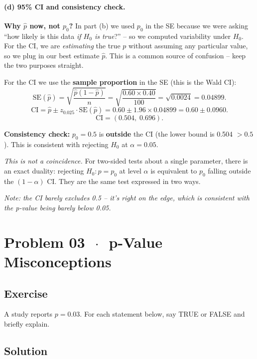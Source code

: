 \documentclass[11pt]{article}
\newcommand{\phat}{\hat{p}}
\begin{document}
\paragraph{(d) 95\% CI and consistency check.}

\textbf{Why $\phat$ now, not $p_0$?} In part (b) we used $p_0$ in the SE because we were asking ``how likely is this data \textit{if $H_0$ is true}?'' -- so we computed variability under $H_0$. For the CI, we are \textit{estimating} the true $p$ without assuming any particular value, so we plug in our best estimate $\phat$. This is a common source of confusion -- keep the two purposes straight.

For the CI we use the \textbf{sample proportion} in the SE (this is the Wald CI):
\[
  \text{SE}(\phat) = \sqrt{\frac{\phat(1-\phat)}{n}} = \sqrt{\frac{0.60 \times 0.40}{100}} = \sqrt{0.0024} = 0.04899.
\]
\[
  \text{CI} = \phat \pm z_{0.025} \cdot \text{SE}(\phat) = 0.60 \pm 1.96 \times 0.04899 = 0.60 \pm 0.0960.
\]
\[
  \boxed{\text{CI} = (0.504,\; 0.696)}.
\]

\textbf{Consistency check:} $p_0 = 0.5$ is \textbf{outside} the CI (the lower bound is 0.504 $> 0.5$). This is consistent with rejecting $H_0$ at $\alpha = 0.05$.

\textit{This is not a coincidence.} For two-sided tests about a single parameter, there is an exact duality: rejecting $H_0\colon p = p_0$ at level $\alpha$ is equivalent to $p_0$ falling outside the $(1-\alpha)$ CI. They are the same test expressed in two ways.

\textit{Note: the CI barely excludes 0.5 -- it's right on the edge, which is consistent with the p-value being barely below 0.05.}

\section*{Problem 03 \texorpdfstring{$\,\cdot\,$}{-} p-Value Misconceptions}

\subsection*{Exercise}

A study reports $p = 0.03$. For each statement below, say TRUE or FALSE and briefly explain.

\subsection*{Solution}
\end{document}
